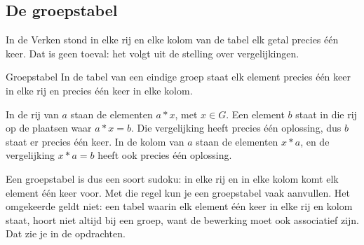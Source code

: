 \begin{oefeningen}
\end{oefeningen}

\subsection{De groepstabel}

In de Verken stond in elke rij en elke kolom van de tabel elk getal precies één keer. Dat is geen toeval: het volgt uit de stelling over vergelijkingen.

\begin{theorie}
\begin{stelling}{Groepstabel}
In de tabel van een eindige groep staat elk element precies één keer in elke rij en precies één keer in elke kolom.
\end{stelling}

\begin{bewijs}
In de rij van $a$ staan de elementen $a \ast x$, met $x \in G$. Een element $b$ staat in die rij op de plaatsen waar $a \ast x = b$. Die vergelijking heeft precies één oplossing, dus $b$ staat er precies één keer. In de kolom van $a$ staan de elementen $x \ast a$, en de vergelijking $x \ast a = b$ heeft ook precies één oplossing.
\end{bewijs}
\end{theorie}

Een groepstabel is dus een soort sudoku: in elke rij en in elke kolom komt elk element één keer voor. Met die regel kun je een groepstabel vaak aanvullen. Het omgekeerde geldt niet: een tabel waarin elk element één keer in elke rij en kolom staat, hoort niet altijd bij een groep, want de bewerking moet ook associatief zijn. Dat zie je in de opdrachten.

